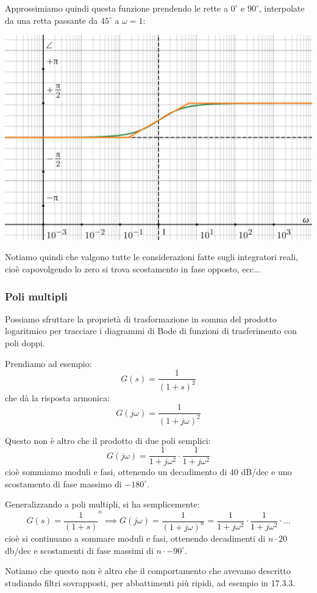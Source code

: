\documentclass[a4paper,11pt]{article}
\begin{document}
\noindent
\begin{minipage}{\textwidth}
Approssimiamo quindi questa funzione prendendo le rette a $0^\circ$ e $90^\circ$, interpolate da una retta passante da $45^\circ$ a $\omega = 1$:
\begin{center}
	\includegraphics[scale=0.3]{../figures/rdifferentiator_bode/phase.png}
\end{center}
\end{minipage}

\par\medskip

Notiamo quindi che valgono tutte le considerazioni fatte sugli integratori reali, cioè capovolgendo lo zero si trova scostamento in fase opposto, ecc...

\subsubsection{Poli multipli}
Possiamo sfruttare la proprietà di trasformazione in somma del prodotto logaritmico per tracciare i diagrammi di Bode di funzioni di trasferimento con poli doppi.

Prendiamo ad esempio: 
$$
G(s) = \frac{1}{(1 + s)^2}
$$
che dà la risposta armonica:
$$
G(j \omega) = \frac{1}{(1 + j \omega)^2}
$$

Questo non è altro che il prodotto di due poli semplici:
$$
G(j \omega) = \frac{1}{1 + j \omega^2} \cdot \frac{1}{1 + j \omega^2}
$$
cioè sommiamo moduli e fasi, ottenendo un decadimento di 40 dB/dec e uno scostamento di fase massimo di $-180^\circ$.

Generalizzando a poli multipli, si ha semplicemente:
$$
G(s) = \frac{1}{(1 + s)}^n \implies G(j \omega) = \frac{1}{(1 + j \omega)^n} = \frac{1}{1 + j \omega^2} \cdot \frac{1}{1 + j \omega^2} \cdot ...
$$
cioè si continuano a sommare moduli e fasi, ottenendo decadimenti di $n \cdot 20 $ db/dec e scostamenti di fase massimi di $n \cdot -90^\circ$.

Notiamo che questo non è altro che il comportamento che avevamo descritto studiando filtri sovrapposti, per abbattimenti più ripidi, ad esempio in 17.3.3.
\end{document}

